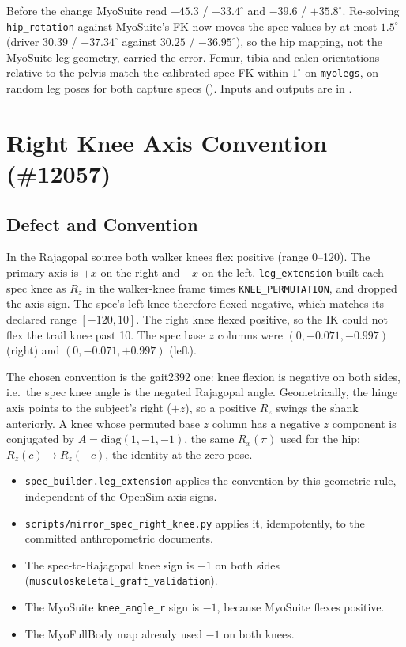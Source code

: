 \documentclass[11pt]{article}
\begin{document}
Before the change MyoSuite read $-45.3$ / $+33.4^\circ$ and $-39.6$ /
$+35.8^\circ$. Re-solving \texttt{hip\_rotation} against MyoSuite's FK now
moves the spec values by at most $1.5^\circ$ (driver $30.39$ / $-37.34^\circ$
against $30.25$ / $-36.95^\circ$), so the hip mapping, not the MyoSuite leg
geometry, carried the error. Femur, tibia and calcn orientations relative
to the pelvis match the calibrated spec FK within $1^\circ$ on
\texttt{myolegs}, on random leg poses for both capture specs
(). Inputs and outputs
are in .

\section{Right Knee Axis Convention (\#12057)}

\subsection{Defect and Convention}
In the Rajagopal source both walker knees flex positive (range
0--120\textdegree). The primary axis is $+x$ on the right and $-x$ on the left.
\texttt{leg\_extension} built each spec knee as $R_z$ in the walker-knee frame
times \texttt{KNEE\_PERMUTATION}, and dropped the axis sign. The spec's left
knee therefore flexed negative, which matches its declared range
$[-120, 10]$\textdegree. The right knee flexed positive, so the IK could not
flex the trail knee past 10\textdegree. The spec base $z$ columns were
$(0,-0.071,-0.997)$ (right) and $(0,-0.071,+0.997)$ (left).

The chosen convention is the gait2392 one: knee flexion is negative on both
sides, i.e.\ the spec knee angle is the negated Rajagopal angle. Geometrically,
the hinge axis points to the subject's right ($+z$), so a positive $R_z$
swings the shank anteriorly. A knee whose permuted base $z$ column has a
negative $z$ component is conjugated by $A=\mathrm{diag}(1,-1,-1)$, the same
$R_x(\pi)$ used for the hip: $R_z(c)\mapsto R_z(-c)$, the identity at the
zero pose.

\begin{itemize}
\item \texttt{spec\_builder.leg\_extension} applies the convention by this
  geometric rule, independent of the OpenSim axis signs.
\item \texttt{scripts/mirror\_spec\_right\_knee.py} applies it, idempotently,
  to the committed anthropometric documents.
\item The spec-to-Rajagopal knee sign is $-1$ on both sides
  (\texttt{musculoskeletal\_graft\_validation}).
\item The MyoSuite \texttt{knee\_angle\_r} sign is $-1$, because MyoSuite
  flexes positive.
\item The MyoFullBody map already used $-1$ on both knees.
\end{itemize}
\end{document}
